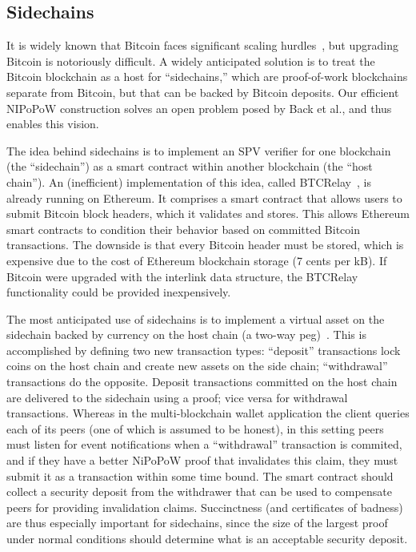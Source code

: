 \subsection{Sidechains}
\label{sec.sidechains}
It is widely known that Bitcoin faces significant scaling
hurdles~\cite{onscaling}, but upgrading Bitcoin is notoriously difficult. A
widely anticipated solution is to treat the Bitcoin blockchain as a host for
``sidechains,'' which are proof-of-work blockchains separate from Bitcoin, but
that can be backed by Bitcoin deposits. Our efficient NIPoPoW construction
solves an open problem posed by Back et al., and thus enables this vision.

The idea behind sidechains is to implement an SPV verifier for one blockchain
(the ``sidechain'') as a smart contract within another blockchain (the ``host
chain''). An (inefficient) implementation of this idea, called
BTCRelay~\cite{ethereum}, is already running on Ethereum. It comprises a
smart contract that allows users to submit Bitcoin block headers, which it validates and
stores. This allows Ethereum smart contracts to condition their behavior based
on committed Bitcoin transactions. The downside is that every Bitcoin header must be
stored, which is expensive due to the cost of Ethereum blockchain storage (7 cents per kB). If
Bitcoin were upgraded with the interlink data structure, the BTCRelay
functionality could be provided inexpensively.

The most anticipated use of sidechains is to implement a virtual asset on the
sidechain backed by currency on the host chain (a two-way
peg)~\cite{sidechains}. This is accomplished by defining two new transaction
types: ``deposit'' transactions lock coins on the host chain and create new
assets on the side chain; ``withdrawal'' transactions do the opposite. Deposit
transactions committed on the host chain are delivered to the sidechain using a
proof; vice versa for withdrawal transactions. Whereas in the multi-blockchain
wallet application the client queries each of its peers (one of which is assumed
to be honest), in this setting peers must listen for event notifications when a
``withdrawal'' transaction is commited, and if they have a better NiPoPoW proof
that invalidates this claim, they must submit it as a transaction within some
time bound. The smart contract should collect a security deposit from the
withdrawer that can be used to compensate peers for providing invalidation
claims. Succinctness (and certificates of badness) are thus especially important
for sidechains, since the size of the largest proof under normal conditions
should determine what is an acceptable security deposit.
